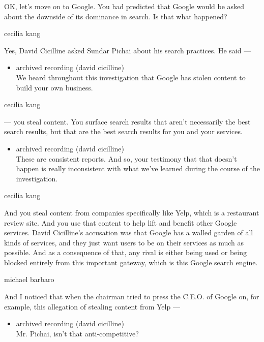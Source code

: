 OK, let's move on to Google. You had predicted that Google would be
asked about the downside of its dominance in search. Is that what
happened?

cecilia kang

Yes, David Cicilline asked Sundar Pichai about his search practices. He
said ---

\begin{itemize}
\tightlist
\item
  archived recording (david cicilline)\\
  We heard throughout this investigation that Google has stolen content
  to build your own business.
\end{itemize}

cecilia kang

--- you steal content. You surface search results that aren't
necessarily the best search results, but that are the best search
results for you and your services.

\begin{itemize}
\tightlist
\item
  archived recording (david cicilline)\\
  These are consistent reports. And so, your testimony that that doesn't
  happen is really inconsistent with what we've learned during the
  course of the investigation.
\end{itemize}

cecilia kang

And you steal content from companies specifically like Yelp, which is a
restaurant review site. And you use that content to help lift and
benefit other Google services. David Cicilline's accusation was that
Google has a walled garden of all kinds of services, and they just want
users to be on their services as much as possible. And as a consequence
of that, any rival is either being used or being blocked entirely from
this important gateway, which is this Google search engine.

michael barbaro

And I noticed that when the chairman tried to press the C.E.O. of Google
on, for example, this allegation of stealing content from Yelp ---

\begin{itemize}
\tightlist
\item
  archived recording (david cicilline)\\
  Mr. Pichai, isn't that anti-competitive?
\end{itemize}

